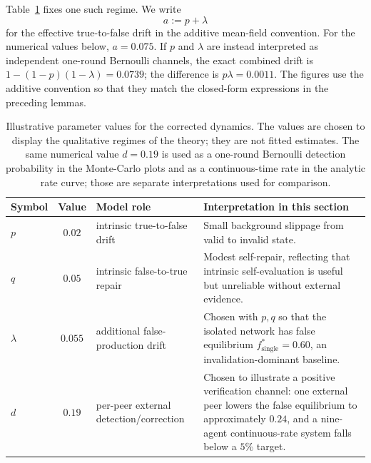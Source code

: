 \documentclass[12pt]{article}
\theoremstyle{definition}
\begin{document}
Table~\ref{tab:param-calibration} fixes one such regime.  We write
\[
    a := p+\lambda
\]
for the effective true-to-false drift in the additive mean-field convention.
For the numerical values below, \(a=0.075\).  If \(p\) and \(\lambda\) are
instead interpreted as independent one-round Bernoulli channels, the exact
combined drift is \(1-(1-p)(1-\lambda)=0.0739\); the difference is
\(p\lambda=0.0011\).  The figures use the additive convention so that they
match the closed-form expressions in the preceding lemmas.

\begin{table}[htbp]
    \centering
    \setlength{\tabcolsep}{5pt}
    \renewcommand{\arraystretch}{1.15}
    \caption{Illustrative parameter values for the corrected dynamics.
    The values are chosen to display the qualitative regimes of the theory;
    they are not fitted estimates.  The same numerical value \(d=0.19\) is used
    as a one-round Bernoulli detection probability in the Monte-Carlo plots and
    as a continuous-time rate in the analytic rate curve; those are separate
    interpretations used for comparison.}
    \label{tab:param-calibration}
    \begin{tabularx}{\linewidth}{@{}lclX@{}}
        \toprule
        Symbol & Value & Model role & Interpretation in this section \\
        \midrule
        \(p\) & \(0.02\) & intrinsic true-to-false drift &
        Small background slippage from valid to invalid state. \\[2pt]
        \(q\) & \(0.05\) & intrinsic false-to-true repair &
        Modest self-repair, reflecting that intrinsic self-evaluation is
        useful but unreliable without external evidence. \\[2pt]
        \(\lambda\) & \(0.055\) & additional false-production drift &
        Chosen with \(p,q\) so that the isolated network has false equilibrium
        \(f_{\mathrm{single}}^*=0.60\), an invalidation-dominant baseline. \\[2pt]
        \(d\) & \(0.19\) & per-peer external detection/correction &
        Chosen to illustrate a positive verification channel: one external
        peer lowers the false equilibrium to approximately \(0.24\), and a
        nine-agent continuous-rate system falls below a \(5\%\) target. \\
        \bottomrule
    \end{tabularx}
\end{table}

\end{document}
